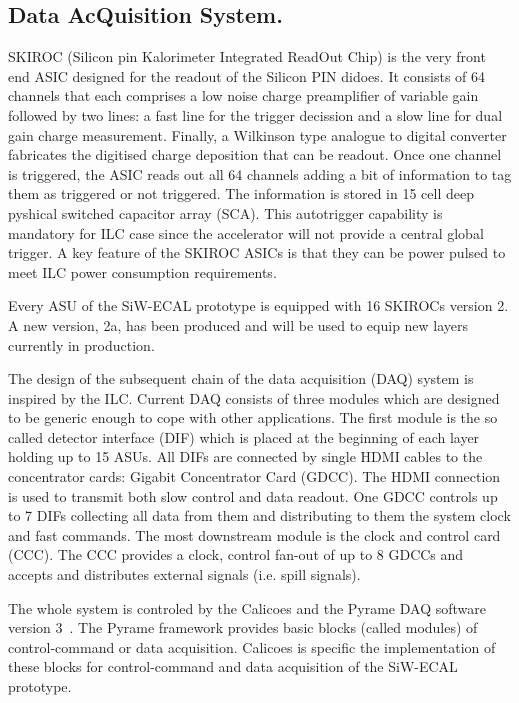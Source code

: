 \documentclass[journal]{IEEEtran}
\begin{document}
\subsection{Data AcQuisition System.}
\label{sec:DAQ}

SKIROC\cite{Callier:2011zz} (Silicon pin Kalorimeter Integrated ReadOut Chip) is the very front end ASIC designed for the readout of the Silicon PIN didoes.
It consists of 64 channels that each comprises a low noise charge preamplifier of variable gain followed by two lines:
a fast line for the trigger decission and a slow line for dual gain charge measurement.
Finally, a Wilkinson type analogue to digital converter fabricates the digitised charge deposition that can be readout. %
Once one channel is triggered, the ASIC reads out all 64 channels adding a bit of information to tag them as triggered or not triggered.
The information is stored in 15 cell deep pyshical switched capacitor array (SCA).
This autotrigger capability is mandatory for ILC case since the accelerator will not provide a central global trigger.
A key feature of the SKIROC ASICs is that they can be power pulsed to meet ILC power consumption requirements.

Every ASU of the SiW-ECAL prototype is equipped with 16 SKIROCs version 2. A new version, 2a, has been produced and will be used to equip new layers currently in production. 

The design of the subsequent chain of the data acquisition (DAQ)\cite{Gastaldi:2014vaa} system is inspired by the ILC.
Current DAQ consists of three modules which are designed to be generic enough to cope with other applications.
The first module is the so called detector interface (DIF) which is placed at the beginning of each layer holding up to 15 ASUs.
All DIFs are connected by single HDMI cables to the concentrator cards: Gigabit Concentrator Card (GDCC).
The HDMI connection is used to transmit both slow control and data readout.
One GDCC controls up to 7 DIFs collecting all data from them and distributing to them the system clock and fast commands.
The most downstream module is the clock and control card (CCC). The CCC provides a clock, control fan-out of up to 8 GDCCs and accepts and distributes external signals (i.e. spill signals).

The whole system is controled by the Calicoes and the Pyrame DAQ software version 3~\cite{pyrame1,pyrame2}. The Pyrame framework provides basic blocks (called modules) of control-command or data acquisition. Calicoes is specific the implementation of these blocks for control-command and data acquisition of the SiW-ECAL prototype. 
\end{document}
